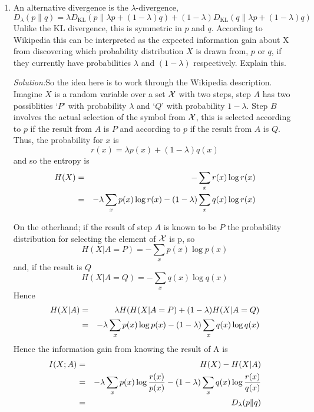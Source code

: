\documentclass[12pt]{article}
\newcommand{\soln}{\noindent\textit{Solution:}}
\begin{document}
\begin{enumerate}
\item An alternative divergence is the $\lambda$-divergence,
\begin{equation}
D_{\lambda}(p\|q) = \lambda D_{\mathrm{KL}}(p\|\lambda p + (1-\lambda)q) + (1-\lambda) D_{\mathrm{KL}}(q\|\lambda p + (1-\lambda)q)
\end{equation}
Unlike the KL divergence, this is symmetric in $p$ and $q$. According to Wikipedia this can be interpreted as the expected information gain about X from discovering which probability distribution $X$ is drawn from, $p$ or $q$, if they currently have probabilities $\lambda$ and $(1-\lambda)$ respectively. Explain this.


\soln So the idea here is to work through the Wikipedia description. Imagine $X$ is a random variable over a set ${\cal X}$ with two steps, step $A$ has two possiblities \lq $P$\rq{} with probability $\lambda$ and \lq $Q$\rq{} with probability $1-\lambda$. Step $B$ involves the actual selection of the symbol from ${\cal X}$, this is selected according to $p$ if the result from $A$ is $P$ and according to $p$ if the result from $A$ is $Q$. Thus, the probability for $x$ is
\begin{equation}
r(x)=\lambda p(x)+(1-\lambda) q(x)
\end{equation}
and so the entropy is
\begin{eqnarray}
H(X)&=&-\sum_xr(x)\log{r(x)}\cr
&=&-\lambda\sum_x p(x)\log{r(x)}-(1-\lambda)\sum_x q(x)\log{r(x)}
\end{eqnarray}

On the otherhand; if the result of step $A$ is known to be $P$ the probability distribution for selecting the element of ${\cal X}$ is p, so
\begin{equation}
H(X|{A}=P)=-\sum_x p(x)\log{p(x)}
\end{equation}
and, if the result is $Q$                                   
\begin{equation}
H(X|{A}=Q)=-\sum_x q(x)\log{q(x)}
\end{equation}
Hence
\begin{eqnarray}
H(X|{A})&=&\lambda H(H(X|{A}=P)+(1-\lambda)H(X|{A}=Q)\cr
&=&-\lambda\sum_x p(x)\log{p(x)}-(1-\lambda)\sum_x q(x)\log{q(x)}
\end{eqnarray}
Hence the information gain from knowing the result of A is
\begin{eqnarray}
I(X;{A})&=&H(X)-H(X|{A})\cr
&=&-\lambda\sum_x p(x)\log{\frac{r(x)}{p(x)}}-(1-\lambda)\sum_x q(x)\log{\frac{r(x)}{q(x)}}\cr
&=&D_{\lambda}(p\|q)
\end{eqnarray}


\end{enumerate}
\end{document}
